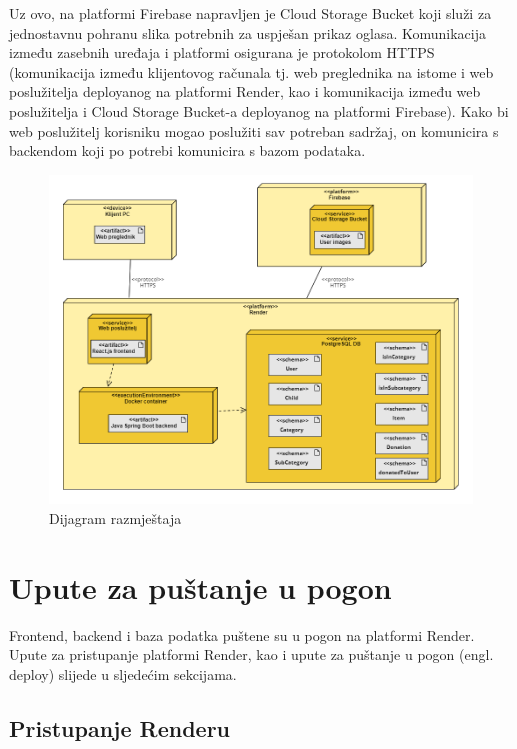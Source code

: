                Uz ovo, na platformi Firebase napravljen je Cloud Storage Bucket koji služi za jednostavnu pohranu slika potrebnih za uspješan prikaz oglasa. Komunikacija između zasebnih uređaja i platformi osigurana je protokolom HTTPS (komunikacija između klijentovog računala tj. web preglednika na istome i web poslužitelja deployanog na platformi Render, kao i komunikacija između web poslužitelja i Cloud Storage Bucket-a deployanog na platformi Firebase). Kako bi web poslužitelj korisniku mogao poslužiti sav potreban sadržaj, on komunicira s backendom koji po potrebi komunicira s bazom podataka.

                \begin{figure}[H]
				\includegraphics[width=\textwidth,height=0.8\textheight]{dijagrami/Dijagram razmjestaja.png}
				\centering
				\caption{Dijagram razmještaja}
				\label{fig:DeploymentDiagram}
			\end{figure}
			
			\eject 
		
		\section{Upute za puštanje u pogon}
		
                Frontend, backend i baza podatka puštene su u pogon na platformi Render. Upute za pristupanje platformi Render, kao i upute za puštanje u pogon (engl. deploy) slijede u sljedećim sekcijama.
          
			    \subsection{Pristupanje Renderu}

